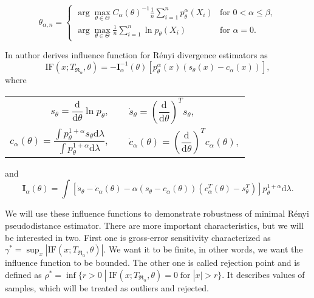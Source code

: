 {\begin{equation}
	\theta_{\alpha,n} = 
	\begin{cases}
		\displaystyle{ \arg \max_{\theta \in \Theta} C_\alpha\left( \theta \right)^{-1} \frac{1}{n} \sum_{i=1}^n p_{\theta}^{\alpha}\left( X_i \right) } & \text{for } 0 < \alpha \leq \beta, \\
		\displaystyle{ \arg \max_{\theta \in \Theta}  \frac{1}{n} \sum_{i=1}^n \ln p_{\theta}\left( X_i \right) } & \text{for } \alpha = 0.
	\end{cases}	
	\label{JK-Renyi-estimator_formula}
\end{equation}

In \cite{Vajda2009} author derives influence function for R\'{e}nyi divergence estimators as 
\begin{equation}
\mathrm{IF}(x;T_{\mathfrak{R}_\alpha},\theta) = -\mathbf{I}^{-1}_{\alpha}(\theta) \left[ p_\theta^\alpha(x) (s_\theta (x) - c_\alpha (x)) \right], \label{JK-IF}
\end{equation}
where

\begin{center}
\begin{tabular}{r l}
$s_\theta = \dfrac{\mathrm{d}}{\mathrm{d}\theta} \ln p_\theta, \quad$ & $ \dot{s}_\theta = \left( \dfrac{\mathrm{d}}{\mathrm{d}\theta} \right)^T s_\theta,$ \\ 

$c_\alpha(\theta) = \dfrac{\int p_\theta^{1+\alpha}s_\theta \mathrm{d}\lambda}{\int p_\theta^{1+\alpha} \mathrm{d}\lambda}, \quad$ & $\dot{c}_\alpha(\theta)= \left( \dfrac{\mathrm{d}}{\mathrm{d}\theta} \right)^T c_\alpha(\theta),$  \\ 
\end{tabular} 
\end{center}
and 
\begin{equation}
\mathbf{I}_{\alpha}(\theta) = \int{ \left[\dot{s}_\theta - \dot{c}_\alpha(\theta) - \alpha(s_\theta - c_\alpha(\theta))(c^T_\alpha(\theta) - s^T_\theta) \right] p_\theta^{1+\alpha} \mathrm{d}\lambda}.
\end{equation}

We will use these influence functions to demonstrate robustness of minimal R\'{e}nyi pseudodistance estimator. There are more important characteristics, but we will be interested in two. First one is gross-error sensitivity characterized as $\gamma^* = \sup_x |\mathrm{IF}(x;T_{\mathfrak{R}_\alpha},\theta)|$. We want it to be finite, in other words, we want the influence function to be bounded. The other one is called rejection point and is defined as 
$\rho^* = \inf\lbrace  r > 0 \; | \; \mathrm{IF}(x;T_{\mathfrak{R}_\alpha},\theta) = 0 \; \mathrm{for} \; |x|> r \rbrace$. It describes values of samples, which will be treated as outliers and rejected.

}

